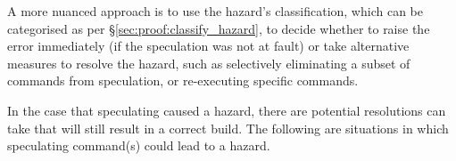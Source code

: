 A more nuanced approach is to use the hazard's classification, which can be categorised as per \S\ref{sec:proof:classify_hazard}, to decide whether to raise the error immediately (if the speculation was not at fault) or take alternative measures to resolve the hazard, such as selectively eliminating a subset of commands from speculation, or re-executing specific commands.








In the case that speculating caused a hazard, there are potential resolutions \Rattle can take that will still result in a correct build.  The following are situations in which \Rattle speculating command(s) could lead to a hazard.


